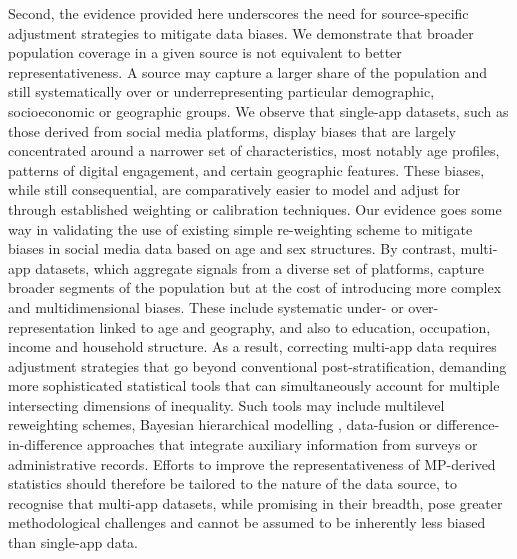 \documentclass[]{rsos}%
\begin{document}
Second, the evidence provided here underscores the need for
source-specific adjustment strategies to mitigate data biases. We
demonstrate that broader population coverage in a given source is not
equivalent to better representativeness. A source may capture a larger
share of the population and still systematically over or
underrepresenting particular demographic, socioeconomic or geographic
groups. We observe that single-app datasets, such as those derived from
social media platforms, display biases that are largely concentrated
around a narrower set of characteristics, most notably age profiles,
patterns of digital engagement, and certain geographic features. These
biases, while still consequential, are comparatively easier to model and
adjust for through established weighting or calibration techniques. Our
evidence goes some way in validating the use of existing simple
re-weighting scheme to mitigate biases in social media data based on age
and sex structures. By contrast, multi-app datasets, which aggregate
signals from a diverse set of platforms, capture broader segments of the
population but at the cost of introducing more complex and
multidimensional biases. These include systematic under- or
over-representation linked to age and geography, and also to education,
occupation, income and household structure. As a result, correcting
multi-app data requires adjustment strategies that go beyond
conventional post-stratification, demanding more sophisticated
statistical tools that can simultaneously account for multiple
intersecting dimensions of inequality. Such tools may include multilevel
reweighting schemes, Bayesian hierarchical modelling \citep{rampazzo2021a},
data-fusion \citep{graells-garrido2023} or difference-in-difference
approaches \citep{zagheni2012} that integrate auxiliary information from
surveys or administrative records. Efforts to improve the representativeness of MP-derived statistics
should therefore be tailored to the nature of the data source, to
recognise that multi-app datasets, while promising in their breadth,
pose greater methodological challenges and cannot be assumed to be
inherently less biased than single-app data.
\end{document}
